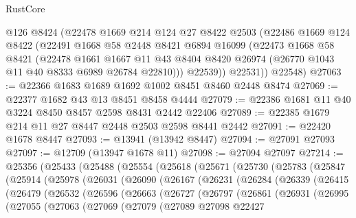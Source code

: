 \begin{lexlean}{RustCore}
\begin{coremodule}
        @126
        @8424
        (@22478
          @1669
          @214
          @124
          @27
          @8422
          @2503
          (@22486
            @1669
            @124
            @8422
            (@22491
              @1668
              @58
              @2448
              @8421
              @6894
              @16099
              (@22473
                @1668
                @58
                @8421
                (@22478
                  @1661
                  @1667
                  @11
                  @43
                  @8404
                  @8420
                  @26974
                  (@26770 @1043 @11 @40 @8333 @6989 @26784 @22810)))
              @22539))
          @22531))
      @22548)
@27063 := @22366 @1683 @1689 @1692 @1002 @8451 @8460 @2448 @8474
@27069 := @22377 @1682 @43 @13 @8451 @8458 @4444
@27079 := @22386 @1681 @11 @40 @3224 @8450 @8457 @2598 @8431 @2442 @22406
@27089 := @22385 @1679 @214 @11 @27 @8447 @2448 @2503 @2598 @8441 @2442
@27091 := @22420 @1678 @8447
@27093 := @13941 (@13942 @8447)
@27094 := @27091 @27093
@27097 := @12709 (@13947 @1678 @11)
@27098 := @27094 @27097
@27214 := @25356
    (@25433
      (@25488
        (@25554
          (@25618
            (@25671
              (@25730
                (@25783
                  (@25847
                    (@25914
                      (@25978
                        (@26031
                          (@26090
                            (@26167
                              (@26231
                                (@26284
                                  (@26339
                                    (@26415
                                      (@26479
                                        (@26532
                                          (@26596
                                            (@26663
                                              (@26727
                                                (@26797
                                                  (@26861
                                                    (@26931
                                                      (@26995
                                                        (@27055
                                                          (@27063
                                                            (@27069
                                                              (@27079
                                                                (@27089
                                                                  @27098
                                                                  @22427

\end{coremodule}
\end{lexlean}
